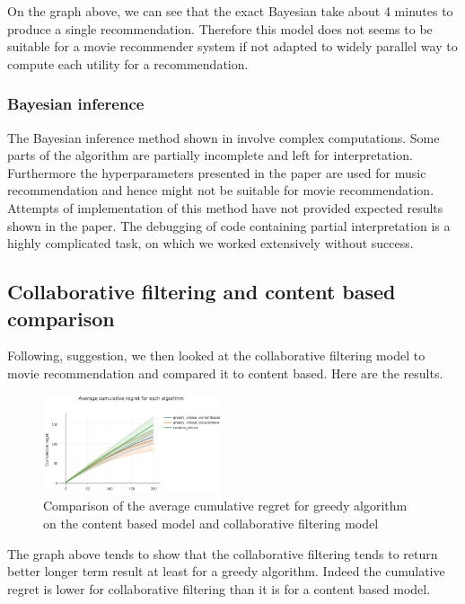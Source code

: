 \documentclass[letterpaper]{article}
\begin{document}
On the graph above, we can see that the exact Bayesian take about 4 minutes to produce a single recommendation. Therefore this model does not seems to be suitable for a movie recommender system if not adapted to widely parallel way to compute each utility for a recommendation.

\subsubsection{Bayesian inference}

The Bayesian inference method shown in \citep{main} involve complex computations. Some parts of the algorithm are partially incomplete and left for interpretation. Furthermore the hyperparameters presented in the paper are used for music recommendation and hence might not be suitable for movie recommendation. Attempts of implementation of this method have not provided expected results shown in the paper. The debugging of code containing partial interpretation is a highly complicated task, on which we worked extensively without success. 

\subsection{Collaborative filtering and content based comparison}

Following, \cite{main} suggestion, we then looked at the collaborative filtering model to movie recommendation and compared it to content based. Here are the results.

\begin{figure}[H]
\begin{center}
\includegraphics[width=0.47\textwidth]{img/collabo1.png}
\caption{Comparison of the average cumulative regret for greedy algorithm on the content based model and collaborative filtering model}
\label{collabo1}
\end{center}
\end{figure}

The graph above tends to show that the collaborative filtering tends to return better longer term result at least for a greedy algorithm. Indeed the cumulative regret is lower for collaborative filtering than it is for a content based model.
\end{document}
